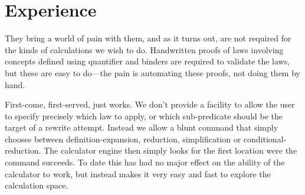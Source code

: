 \section{Experience}\label{sec:Experience}




They bring a world of pain with them,
    and as it turns out, are not required
    for the kinds of calculations we wish to do.
    Handwritten proofs of laws involving concepts
    defined using quantifier and binders
    are required to validate the laws,
    but these are easy to do---the pain is automating these proofs,
    not doing them by hand.

First-come, first-served, just works.
We don't provide a facility
to allow the user to specify
precisely which law to apply,
or which sub-predicate should be the target of a rewrite attempt.
Instead we allow a blunt command that simply chooses between
definition-expansion, reduction, simplification or conditional-reduction.
The calculator engine then simply looks for the first location
were the command succeeds.
To date this has had no major effect on the ability of the calculator
to work, but instead makes it very easy and fast to explore the calculation space.
